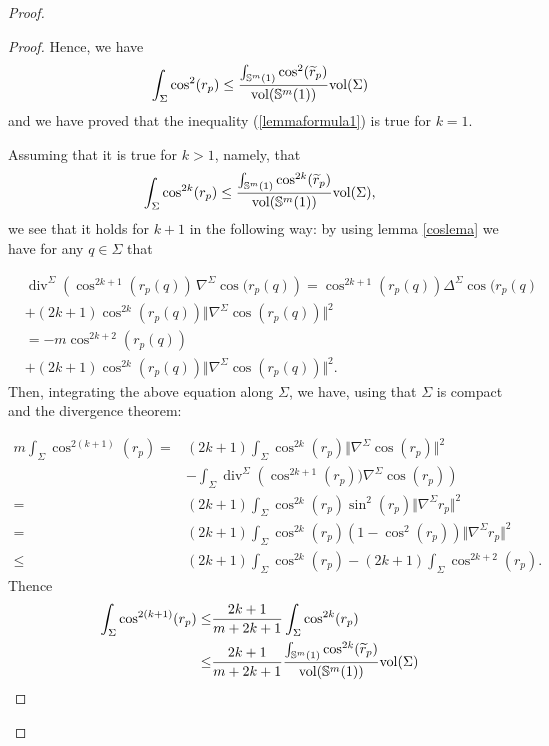 \documentclass[11pt,letterpaper]{amsart}
\theoremstyle{definition}
\theoremstyle{remark}
\newcommand{\Div}{\operatorname{div}}
\begin{document}
\begin{proof}
\begin{proof}
Hence,  we have 
\begin{equation}\label{eqsis}
\int_\Sigma \cos^2(r_p) \leq \frac{\int_{\mathbb{S}^m(1)} \cos^2(\widetilde{r}_p)}{{\rm vol}(\mathbb{S}^m(1))} {\rm vol}(\Sigma)
\end{equation}
and we have proved that the inequality (\ref{lemmaformula1}) is true for $k=1$.

Assuming that it is true for $k >1$, namely, that
\begin{equation}\label{eqsisBis}
\int_\Sigma \cos^{2k}(r_p) \leq \frac{\int_{\mathbb{S}^m(1)} \cos^{2k}(\widetilde{r}_p)}{{\rm vol}(\mathbb{S}^m(1))} {\rm vol}(\Sigma),
\end{equation}
we see that it holds for $k+1$ in the following way: by using lemma \ref{coslema}  we have  for any $q\in \Sigma$ that

\begin{equation}
\begin{aligned}
&\Div^\Sigma\left(\cos^{2k+1} (r_p(q))\,\nabla^\Sigma \cos(r_p(q)\right)=\cos^{2k+1}(r_p(q))\Delta^\Sigma\cos(r_p(q)\\&+(2k+1) \cos^{2k}(r_p(q))\Vert \nabla^\Sigma \cos(r_p(q))\Vert^2\\
&=-m\cos^{2k+2}(r_p(q))\\&+(2k+1) \cos^{2k}(r_p(q))\Vert \nabla^\Sigma \cos(r_p(q))\Vert^2.
\end{aligned}
\end{equation}
Then, integrating the above equation  along $\Sigma$, we have, using that $\Sigma$ is compact and the divergence theorem:

\begin{equation}\label{eqdossBis}
\begin{aligned}
m\int_\Sigma \cos^{2(k+1)}(r_p)=&(2k+1)\int_\Sigma\cos^{2k}(r_p)\Vert \nabla^{\Sigma}  \cos(r_p)\Vert^2\\&-\int_\Sigma \Div^\Sigma\left(\cos^{2k+1}(r_p))\nabla^\Sigma \cos(r_p)\right)
\\
=&(2k+1)\int_\Sigma \cos^{2k}(r_p)\sin^2(r_p)\Vert \nabla^{\Sigma} r_p\Vert^2\\
=&(2k+1)\int_\Sigma \cos^{2k}(r_p)\left(1-\cos^2(r_p)\right)\Vert \nabla^{\Sigma} r_p\Vert^2\\
\leq& (2k+1)\int_\Sigma \cos^{2k}(r_p)-(2k+1)\int_\Sigma \cos^{2k+2}(r_p).
\end{aligned}
\end{equation}
Thence
\begin{equation}\label{eqdoss2Bis}
\begin{aligned}
\int_\Sigma \cos^{2(k+1)}(r_p)\leq &\frac{2k+1}{m+2k+1}\int_\Sigma \cos^{2k}(r_p)\\ 
\leq&  \frac{2k+1}{m+2k+1}\frac{\int_{\mathbb{S}^m(1)} \cos^{2k}(\widetilde{r}_p)}{{\rm vol}(\mathbb{S}^m(1))} {\rm vol}(\Sigma)
\end{aligned}
\end{equation}


\end{proof}
\end{proof}
\end{document}
